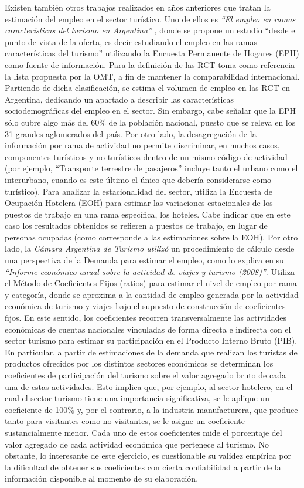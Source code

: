 \documentclass[
  openany]{book}
\begin{document}
Existen también otros trabajos realizados en años anteriores que tratan la estimación del empleo en el sector turístico. Uno de ellos es \emph{``El empleo en ramas características del turismo en Argentina''} \citep{mintur2007}, donde se propone un estudio ``desde el punto de vista de la oferta, es decir estudiando el empleo en las ramas características del turismo'' utilizando la Encuesta Permanente de Hogares (EPH) como fuente de información. Para la definición de las RCT toma como referencia la lista propuesta por la OMT, a fin de mantener la comparabilidad internacional.
Partiendo de dicha clasificación, se estima el volumen de empleo en las RCT en Argentina, dedicando un apartado a describir las características sociodemográficas del empleo en el sector. Sin embargo, cabe señalar que la EPH sólo cubre algo más del 60\% de la población nacional, puesto que se releva en los 31 grandes aglomerados del país. Por otro lado, la desagregación de la información por rama de actividad no permite discriminar, en muchos casos, componentes turísticos y no turísticos dentro de un mismo código de actividad (por ejemplo, ``Transporte terrestre de pasajeros'' incluye tanto el urbano como el interurbano, cuando es este último el único que debería considerarse como turístico).
Para analizar la estacionalidad del sector, utiliza la Encuesta de Ocupación Hotelera (EOH) para estimar las variaciones estacionales de los puestos de trabajo en una rama específica, los hoteles. Cabe indicar que en este caso los resultados obtenidos se refieren a puestos de trabajo, en lugar de personas ocupadas (como corresponde a las estimaciones sobre la EOH).
Por otro lado, la \emph{Cámara Argentina de Turismo utilizó} un procedimiento de cálculo desde una perspectiva de la Demanda para estimar el empleo, como lo explica en su \emph{``Informe económico anual sobre la actividad de viajes y turismo (2008)''}. Utiliza el Método de Coeficientes Fijos (ratios) para estimar el nivel de empleo por rama y categoría, donde se aproxima a la cantidad de empleo generada por la actividad económica de turismo y viajes bajo el supuesto de construcción de coeficientes fijos.
En este sentido, los coeficientes recorren transversalmente las actividades económicas de cuentas nacionales vinculadas de forma directa e indirecta con el sector turismo para estimar su participación en el Producto Interno Bruto (PIB). En particular, a partir de estimaciones de la demanda que realizan los turistas de productos ofrecidos por los distintos sectores económicos se determinan los coeficientes de participación del turismo sobre el valor agregado bruto de cada una de estas actividades. Esto implica que, por ejemplo, al sector hotelero, en el cual el sector turismo tiene una importancia significativa, se le aplique un coeficiente de 100\% y, por el contrario, a la industria manufacturera, que produce tanto para visitantes como no visitantes, se le asigne un coeficiente sustancialmente menor.
Cada uno de estos coeficientes mide el porcentaje del valor agregado de cada actividad económica que pertenece al turismo. No obstante, lo interesante de este ejercicio, es cuestionable su validez empírica por la dificultad de obtener sus coeficientes con cierta confiabilidad a partir de la información disponible al momento de su elaboración.
\end{document}
